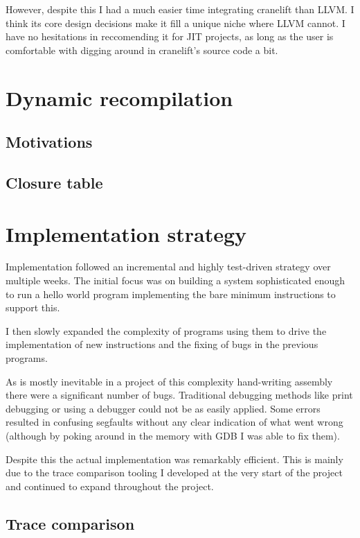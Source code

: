 However, despite this I had a much easier time integrating cranelift than LLVM. I think its core
design decisions make it fill a unique niche where LLVM cannot. I have no hesitations in
reccomending it for JIT projects, as long as the user is comfortable with digging around in
cranelift's source code a bit.

\section{Dynamic recompilation} \label{dyn-recomp}

\subsection{Motivations}

\subsection{Closure table}

\section{Implementation strategy}

Implementation followed an incremental and highly test-driven strategy over multiple weeks. The
initial focus was on building a system sophisticated enough to run a hello world program
implementing the bare minimum instructions to support this.

I then slowly expanded the complexity of programs using them to drive the implementation of new
instructions and the fixing of bugs in the previous programs.

As is mostly inevitable in a project of this complexity hand-writing assembly there were a
significant number of bugs. Traditional debugging methods like print debugging or using a debugger
could not be as easily applied. Some errors resulted in confusing segfaults without any clear
indication
of what went wrong (although by poking around in the memory with GDB I was able to fix them).

Despite this the actual implementation was remarkably efficient. This is mainly due to the trace
comparison tooling I developed at the very start of the project and continued to expand throughout
the project.

\subsection{Trace comparison} \label{tracing}

